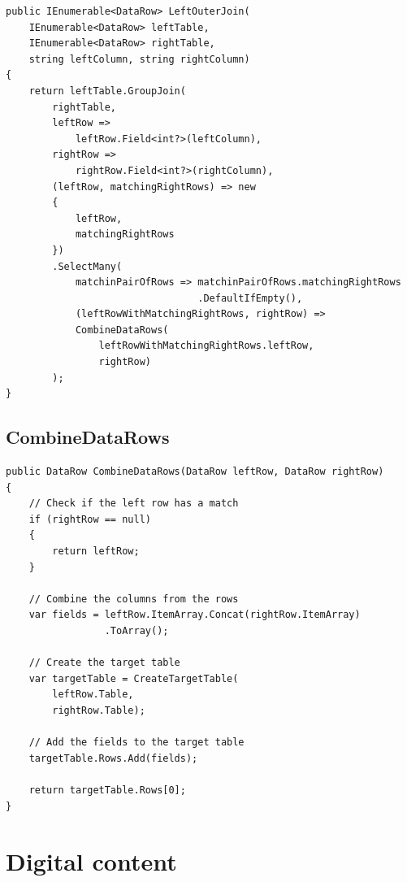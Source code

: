 \documentclass[
  print,
  table,
  nolof,
  nolot,
  nocover,
  oneside
]{fithesis3}
\begin{document}
\begin{lstlisting}
public IEnumerable<DataRow> LeftOuterJoin(
    IEnumerable<DataRow> leftTable,
    IEnumerable<DataRow> rightTable,
    string leftColumn, string rightColumn)
{
    return leftTable.GroupJoin(
        rightTable,
        leftRow =>
            leftRow.Field<int?>(leftColumn),
        rightRow =>
            rightRow.Field<int?>(rightColumn),
        (leftRow, matchingRightRows) => new
        {
            leftRow,
            matchingRightRows
        })
        .SelectMany(
            matchinPairOfRows => matchinPairOfRows.matchingRightRows
                                 .DefaultIfEmpty(),
            (leftRowWithMatchingRightRows, rightRow) =>
            CombineDataRows(
                leftRowWithMatchingRightRows.leftRow,
                rightRow)
        );
}
\end{lstlisting}
\newpage


\section{CombineDataRows}
\label{combinedatarows}
\begin{lstlisting}
public DataRow CombineDataRows(DataRow leftRow, DataRow rightRow)
{
    // Check if the left row has a match
    if (rightRow == null)
    {
        return leftRow;
    }
    
    // Combine the columns from the rows
    var fields = leftRow.ItemArray.Concat(rightRow.ItemArray)
                 .ToArray();
    
    // Create the target table
    var targetTable = CreateTargetTable(
        leftRow.Table,
        rightRow.Table);
    
    // Add the fields to the target table
    targetTable.Rows.Add(fields);
    
    return targetTable.Rows[0];
}
\end{lstlisting}



\chapter{Digital content}
\label{digitalcontent}
\end{document}
